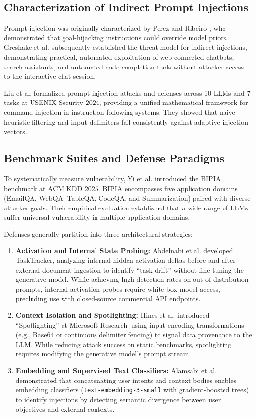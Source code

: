 \documentclass[10pt,conference]{IEEEtran}
\begin{document}
\subsection{Characterization of Indirect Prompt Injections}
Prompt injection was originally characterized by Perez and Ribeiro \cite{perez2022prompt}, who demonstrated that goal-hijacking instructions could override model priors. Greshake et al. \cite{greshake2023not} subsequently established the threat model for indirect injections, demonstrating practical, automated exploitation of web-connected chatbots, search assistants, and automated code-completion tools without attacker access to the interactive chat session.

Liu et al. \cite{liu2024formalizing} formalized prompt injection attacks and defenses across 10 LLMs and 7 tasks at USENIX Security 2024, providing a unified mathematical framework for command injection in instruction-following systems. They showed that naive heuristic filtering and input delimiters fail consistently against adaptive injection vectors.

\subsection{Benchmark Suites and Defense Paradigms}
To systematically measure vulnerability, Yi et al. \cite{yi2025bipia} introduced the BIPIA benchmark at ACM KDD 2025. BIPIA encompasses five application domains (EmailQA, WebQA, TableQA, CodeQA, and Summarization) paired with diverse attacker goals. Their empirical evaluation established that a wide range of LLMs suffer universal vulnerability in multiple application domains.

Defenses generally partition into three architectural strategies:
\begin{enumerate}
    \item \textbf{Activation and Internal State Probing:} Abdelnabi et al. \cite{abdelnabi2024tasktracker} developed TaskTracker, analyzing internal hidden activation deltas before and after external document ingestion to identify ``task drift'' without fine-tuning the generative model. While achieving high detection rates on out-of-distribution prompts, internal activation probes require white-box model access, precluding use with closed-source commercial API endpoints.
    \item \textbf{Context Isolation and Spotlighting:} Hines et al. \cite{hines2024defending} introduced ``Spotlighting'' at Microsoft Research, using input encoding transformations (e.g., Base64 or continuous delimiter fencing) to signal data provenance to the LLM. While reducing attack success on static benchmarks, spotlighting requires modifying the generative model's prompt stream.
    \item \textbf{Embedding and Supervised Text Classifiers:} Alamsabi et al. \cite{alamsabi2026embedding} demonstrated that concatenating user intents and context bodies enables embedding classifiers (\texttt{text-embedding-3-small} with gradient-boosted trees) to identify injections by detecting semantic divergence between user objectives and external contexts.
\end{enumerate}
\end{document}
